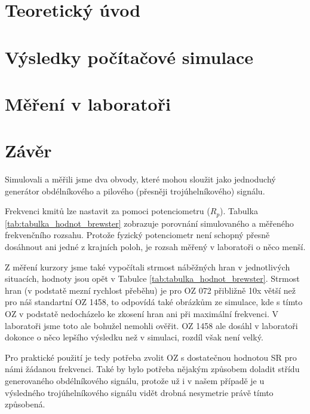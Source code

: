 \documentclass{protokol}
\begin{document}
	\maketitle

	\section{Teoretický úvod}
		
		
	\section{Výsledky počítačové simulace}
		
		
	\clearpage
	\section{Měření v laboratoři}
		
		
		
	\clearpage
	\section{Závěr}
		Simulovali a měřili jsme dva obvody, které mohou sloužit jako jednoduchý generátor obdélníkového a pilového (přesněji trojúhelníkového) signálu.

		Frekvenci kmitů lze nastavit za pomoci potenciometru (\(R_{p} \)). Tabulka \ref{tab:tabulka_hodnot_brewster} zobrazuje porovnání simulovaného a měřeného frekvenčního rozsahu. Protože fyzický potenciometr není schopný přesně dosáhnout ani jedné z krajních poloh, je rozsah měřený v laboratoři o něco menší.
		
		Z měření kurzory jsme také vypočítali strmost náběžných hran v jednotlivých situacích, hodnoty jsou opět v Tabulce \ref{tab:tabulka_hodnot_brewster}. Strmost hran (v podstatě mezní rychlost přeběhu) je pro OZ 072 přibližně 10x větší než pro náš standartní OZ 1458, to odpovídá také obrázkům ze simulace, kde s tímto OZ v podstatě nedocházelo ke zkosení hran ani při maximální frekvenci. V laboratoři jsme toto ale bohužel nemohli ověřit. 
		OZ 1458 ale dosáhl v laboratoři dokonce o něco lepšího výsledku než v simulaci, rozdíl však není velký.

		Pro praktické použití je tedy potřeba zvolit OZ s dostatečnou hodnotou SR pro námi žádanou frekvenci. Také by bylo potřeba nějakým způsobem doladit střídu generovaného obdélníkového signálu, protože už i v našem případě je u výsledného trojúhelníkového signálu vidět drobná nesymetrie právě tímto způsobená. 

	
\end{document}
